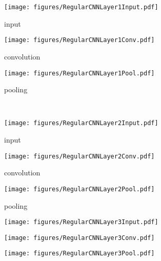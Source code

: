 %
\begin{figure*}[t]
\centering
	\begin{subfigure}{.3\textwidth}
		\centering
		\texttt{[image: figures/RegularCNNLayer1Input.pdf]}
		\caption{input}
		\label{layer1input}
	\end{subfigure}
	\hfill
	\begin{subfigure}{.3\textwidth}
		\centering
		\texttt{[image: figures/RegularCNNLayer1Conv.pdf]} 
		\caption{convolution}
		\label{layer1conv}
	\end{subfigure}
	\hfill
	\begin{subfigure}{.3\textwidth}
		\centering
		\texttt{[image: figures/RegularCNNLayer1Pool.pdf]} 
		\caption{pooling}
		\label{layer1pool}
	\end{subfigure}
	\\ \vspace{0.5cm}
	\begin{subfigure}{.16\textwidth}
		\centering
		\texttt{[image: figures/RegularCNNLayer2Input.pdf]}
		\caption{input}
		\label{layer2input}
	\end{subfigure}
	\hfill
	\begin{subfigure}{.16\textwidth}
		\centering
		\texttt{[image: figures/RegularCNNLayer2Conv.pdf]}
		\caption{convolution}
		\label{layer2conv}
	\end{subfigure}
	\hfill
	\begin{subfigure}{.16\textwidth}
		\centering
		\texttt{[image: figures/RegularCNNLayer2Pool.pdf]}
		\caption{pooling}
		\label{layer2pool}
	\end{subfigure}
	\hfill
	\begin{subfigure}{.05\textwidth}
		\centering
		\texttt{[image: figures/RegularCNNLayer3Input.pdf]}
		\caption{}
		\label{layer3input}
	\end{subfigure}
	\hfill
	\begin{subfigure}{.05\textwidth}
		\centering
		\texttt{[image: figures/RegularCNNLayer3Conv.pdf]}  
		\caption{}
		\label{layer3conv}
	\end{subfigure}
	\hfill
	\begin{subfigure}{.05\textwidth}
		\centering
		\texttt{[image: figures/RegularCNNLayer3Pool.pdf]}

\end{subfigure}
\end{figure*}
